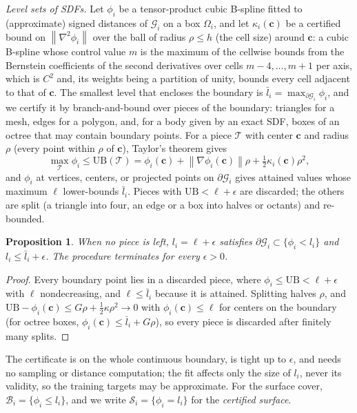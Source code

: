 \documentclass[journal]{IEEEtran}
\newtheorem{proposition}{Proposition}
\theoremstyle{definition}
\newcommand{\norm}[1]{\left\lVert #1\right\rVert}
\begin{document}
\emph{Level sets of SDFs.} Let $\phi_i$ be a tensor-product cubic B-spline fitted to (approximate)
signed distances of $\mathcal G_i$ on a box $\Omega_i$, and let $\kappa_i(\mathbf c)$ be a certified
bound on $\norm{\nabla^2\phi_i}$ over the ball of radius $\rho\le h$ (the cell size) around $\mathbf c$: a
cubic B-spline whose control value $m$ is the maximum of the cellwise bounds from the Bernstein
coefficients of the second derivatives over cells $m-4,\dots,m+1$ per axis, which is $C^2$ and, its
weights being a partition of unity, bounds every cell adjacent to that of $\mathbf c$. The smallest level that encloses the boundary is
$\bar l_i=\max_{\partial\mathcal G_i}\phi_i$, and we certify it by branch-and-bound over pieces of the
boundary: triangles for a mesh, edges for a polygon, and, for a body given by an exact SDF, boxes of an
octree that may contain boundary points. For a piece $\mathcal T$ with center $\mathbf c$ and radius
$\rho$ (every point within $\rho$ of $\mathbf c$), Taylor's theorem gives
\begin{equation}\label{eq:level-ub}
\max_{\mathcal T}\phi_i\le\mathrm{UB}(\mathcal T)=\phi_i(\mathbf c)+\norm{\nabla\phi_i(\mathbf c)}\rho
+\tfrac12\kappa_i(\mathbf c)\rho^2 ,
\end{equation}
and $\phi_i$ at vertices, centers, or projected points on $\partial\mathcal G_i$ gives attained values
whose maximum $\ell$ lower-bounds $\bar l_i$. Pieces with $\mathrm{UB}<\ell+\epsilon$ are discarded;
the others are split (a triangle into four, an edge or a box into halves or octants) and re-bounded.
\begin{proposition}\label{prop:level}
When no piece is left, $l_i=\ell+\epsilon$ satisfies $\partial\mathcal G_i\subset\{\phi_i<l_i\}$ and
$l_i\le\bar l_i+\epsilon$. The procedure terminates for every $\epsilon>0$.
\end{proposition}
\begin{proof}
Every boundary point lies in a discarded piece, where $\phi_i\le\mathrm{UB}<\ell+\epsilon$ with $\ell$
nondecreasing, and $\ell\le\bar l_i$ because it is attained. Splitting halves $\rho$, and
$\mathrm{UB}-\phi_i(\mathbf c)\le G\rho+\tfrac12\kappa\rho^2\to0$ with $\phi_i(\mathbf c)\le\ell$ for
centers on the boundary (for octree boxes, $\phi_i(\mathbf c)\le\bar l_i+G\rho$), so every piece is
discarded after finitely many splits.
\end{proof}
The certificate is on the whole continuous boundary, is tight up to $\epsilon$, and needs no
sampling or distance computation; the fit affects only the size of $l_i$, never its validity, so the
training targets may be approximate. For the surface cover, $\mathcal B_i=\{\phi_i\le l_i\}$, and we
write $\mathcal S_i=\{\phi_i=l_i\}$ for the \emph{certified surface}.
\end{document}
